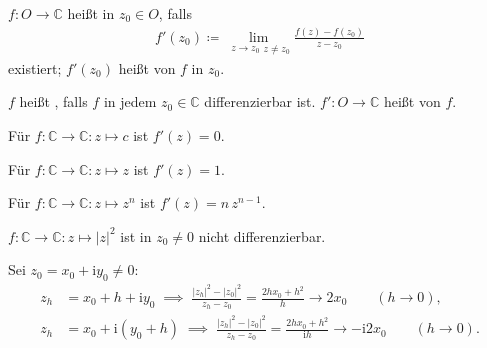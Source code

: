 \documentclass[a4paper,10pt]{scrbook}
\begin{document}
\begin{theorem}[Definition]
  \begin{enum-arab}
    \item $f : O \to \mathbb{C}$ heißt  in $z_0 \in O$, falls
    \begin{align*}
      f'(z_0) \coloneq \lim\limits_{\substack{z \to z_0}{z \neq z_0}} \frac{f(z) - f(z_0)}{z - z_0}
    \end{align*}
    existiert; $f'(z_0)$ heißt  von $f$ in $z_0$.

    \item $f$ heißt , falls $f$ in jedem $z_0 \in \mathbb{C}$ differenzierbar ist. $f' : O \to \mathbb{C}$ heißt  von $f$.
  \end{enum-arab}
\end{theorem}

\begin{example} \label{thm:1.23}
  \begin{enum-arab}
    \item Für $f : \mathbb{C} \to \mathbb{C} : z \mapsto c$ ist $f'(z)=0$.

    \item Für $f : \mathbb{C} \to \mathbb{C} : z \mapsto z$ ist $f'(z)=1$.

    \item Für $f : \mathbb{C} \to \mathbb{C} : z \mapsto z^n$ ist $f'(z)=n \, z^{n-1}$.

    \item $f : \mathbb{C} \to \mathbb{C} : z \mapsto |z|^2$ ist in $z_0 \neq 0$ nicht differenzierbar.

    Sei $z_0 = x_0 + \mathrm{i} y_0 \neq 0$:
    \begin{align*}
      z_h &= x_0 + h + \mathrm{i} y_0 \; \implies \; \frac{|z_h|^2 - |z_0|^2}{z_h - z_0} = \frac{2 h x_0 + h^2}{h} \to 2 x_0 \qquad (h \to 0),\\
      z_h &= x_0 + \mathrm{i} (y_0 + h) \; \implies \; \frac{|z_h|^2 - |z_0|^2}{z_h - z_0} = \frac{2 h x_0 + h^2}{\mathrm{i} h} \to - \mathrm{i} 2 x_0 \qquad (h \to 0).
    \end{align*}
  \end{enum-arab}
\end{example}

\end{document}
